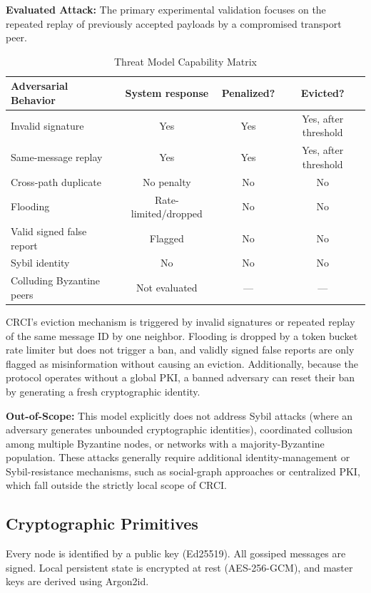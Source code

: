 \documentclass[conference]{IEEEtran}
\begin{document}
\textbf{Evaluated Attack:} The primary experimental validation focuses on the repeated replay of previously accepted payloads by a compromised transport peer.

\begin{table}[h]
\centering
\caption{Threat Model Capability Matrix}
\begin{tabular}{lccc}
\toprule
\textbf{Adversarial Behavior} & \textbf{System response} & \textbf{Penalized?} & \textbf{Evicted?} \\
\midrule
Invalid signature & Yes & Yes & Yes, after threshold \\
Same-message replay & Yes & Yes & Yes, after threshold \\
Cross-path duplicate & No penalty & No & No \\
Flooding & Rate-limited/dropped & No & No \\
Valid signed false report & Flagged & No & No \\
Sybil identity & No & No & No \\
Colluding Byzantine peers & Not evaluated & --- & --- \\
\bottomrule
\end{tabular}
\label{tab:threat_matrix}
\end{table}

CRCI's eviction mechanism is triggered by invalid signatures or repeated replay of the same message ID by one neighbor. Flooding is dropped by a token bucket rate limiter but does not trigger a ban, and validly signed false reports are only flagged as misinformation without causing an eviction. Additionally, because the protocol operates without a global PKI, a banned adversary can reset their ban by generating a fresh cryptographic identity.

\textbf{Out-of-Scope:} This model explicitly does not address Sybil attacks \cite{douceur2002sybil, yu2006sybilguard, yu2010sybillimit} (where an adversary generates unbounded cryptographic identities), coordinated collusion among multiple Byzantine nodes, or networks with a majority-Byzantine population. These attacks generally require additional identity-management or Sybil-resistance mechanisms, such as social-graph approaches \cite{yu2006sybilguard, yu2010sybillimit} or centralized PKI, which fall outside the strictly local scope of CRCI.

\subsection{Cryptographic Primitives}
Every node is identified by a public key (Ed25519). All gossiped messages are signed. Local persistent state is encrypted at rest (AES-256-GCM), and master keys are derived using Argon2id.
\end{document}
